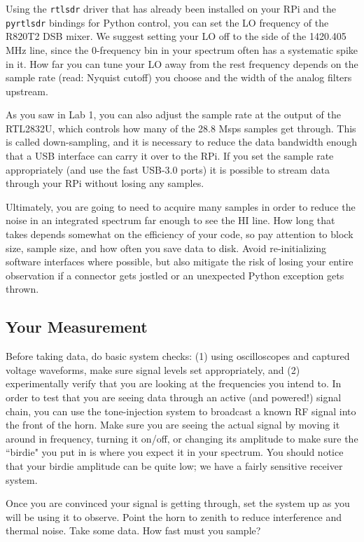 \documentclass[11pt,preprint]{aastex}
\begin{document}
Using the {\tt rtlsdr} driver that has already been installed on your
RPi and the {\tt pyrtlsdr} bindings for Python control, you can set
the LO frequency of the R820T2 DSB mixer.
We suggest setting your LO off to the side of the 1420.405 MHz line,
since the 0-frequency bin in your spectrum often has a
systematic spike in it. How far you can tune your LO away from the
rest frequency depends on the sample rate (read: Nyquist cutoff) you
choose and the width of the analog filters upstream.

As you saw in Lab 1, you can also adjust the
sample rate at the output of the RTL2832U, which controls how many of
the 28.8 Msps samples get through. This is called down-sampling, and
it is necessary to reduce the data bandwidth enough that a
USB interface can carry it over to the RPi. If you set the sample
rate appropriately (and use the fast USB-3.0 ports)
it is possible to stream data through your RPi without losing any samples.

Ultimately, you are going to need to acquire many samples in order
to reduce the noise in an integrated spectrum far enough to see
the HI line. How long that takes depends somewhat on the efficiency
of your code, so pay attention to block size, sample size,
and how often you save data to disk. Avoid re-initializing software 
interfaces where possible, but also mitigate the risk of losing your
entire observation if a connector gets jostled or an unexpected Python
exception gets thrown.

\subsection{Your Measurement}

\noindent
Before taking data, do basic system
checks: (1) using oscilloscopes and captured voltage waveforms,
make sure signal levels set appropriately, and (2) experimentally
verify that you are looking at the frequencies you intend to. In order
to test that you are seeing data through an active (and powered!) signal
chain, you can use the tone-injection system to broadcast a known
RF signal into the front of the horn. 
Make sure you are seeing the actual signal by moving
it around in frequency, turning it on/off, or changing its amplitude
to make sure the ``birdie" you put in is where you expect it in
your spectrum.  You should notice that your birdie amplitude can be quite low;
we have a fairly sensitive receiver system.

Once you are convinced your signal is getting through,
set the system up as you will be using it to observe. Point the
 horn to zenith to reduce interference and thermal noise.  Take some
data.  How fast must you sample? 
\end{document}
